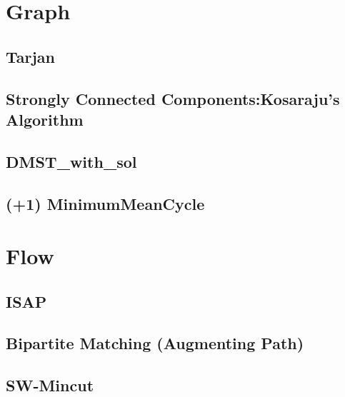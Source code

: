 \documentclass[10pt,twocolumn,oneside]{article}
\begin{document}
\section{Graph}

\subsection{Tarjan}


\subsection{Strongly Connected Components:Kosaraju's Algorithm}


%

\subsection{DMST\_with\_sol}


\subsection{(+1) MinimumMeanCycle}


\section{Flow}
\subsection{ISAP} %


\subsection{Bipartite Matching (Augmenting Path)}


\subsection{SW-Mincut}

\end{document}
